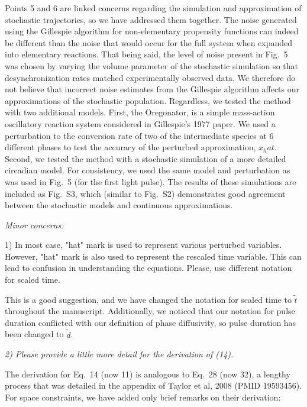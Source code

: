 \documentclass[11pt, letterpaper]{article}
\newenvironment{reviewer}{\itshape\color{gray}}{}
\begin{document}
Points 5 and 6 are linked concerns regarding the simulation and approximation of stochastic trajectories, so we have addressed them together.
The noise generated using the Gillespie algorithm for non-elementary propensity functions can indeed be different than the noise that would occur for the full system when expanded into elementary reactions.
That being said, the level of noise present in Fig.~5 was chosen by varying the volume parameter of the stochastic simulation so that desynchronization rates matched experimentally observed data.
We therefore do not believe that incorrect noise estimates from the Gillespie algorithm affects our approximations of the stochastic population.
Regardless, we tested the method with two additional models.
First, the Oregonator, is a simple mass-action oscillatory reaction system considered in Gillespie's 1977 paper.
We used a perturbation to the conversion rate of two of the intermediate species at 6 different phases to test the accuracy of the perturbed approximation, $x_hat$.
Second, we tested the method with a stochastic simulation of a more detailed circadian model.
For consistency, we used the same model and perturbation as was used in Fig.~5 (for the first light pulse).
The results of these simulations are included as Fig.~S3, which (similar to Fig.~S2) demonstrates good agreement between the stochastic models and continuous approximations.
 
\begin{reviewer}
Minor concerns: 

1) In most case, "hat" mark is used to represent various perturbed variables. However, "hat" mark is also used to represent the rescaled time variable. This can lead to confusion in understanding the equations. Please, use different notation for scaled time.
\end{reviewer}

This is a good suggestion, and we have changed the notation for scaled time to $\tilde{t}$ throughout the manuscript. Additionally, we noticed that our notation for pulse duration conflicted with our definition of phase diffusivity, so pulse duration has been changed to $\tilde{d}$.

\begin{reviewer}
2) Please provide a little more detail for the derivation of (14).
\end{reviewer}

The derivation for Eq.~14 (now 11) is analogous to Eq.~28 (now 32), a lengthy process that was detailed in the appendix of Taylor et al, 2008 (PMID 19593456).
For space constraints, we have added only brief remarks on their derivation:
\end{document}
